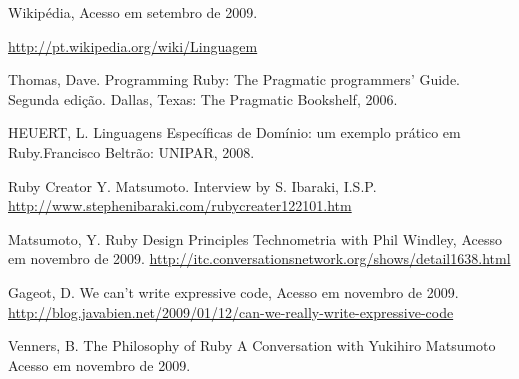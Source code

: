 \documentclass[espaco=simples,appendix=Name]{abnt}
\begin{document}

\begin{thebibliography}{9} 
Wikipédia, 
Acesso em setembro de 2009.

\url{http://pt.wikipedia.org/wiki/Linguagem}

Thomas, Dave. 
Programming Ruby: The Pragmatic programmers’ Guide. 
Segunda edição. Dallas, Texas: The Pragmatic Bookshelf, 2006.


HEUERT, L. Linguagens Específicas de Domínio: um exemplo prático em Ruby.Francisco Beltrão: UNIPAR, 2008.

Ruby Creator Y. Matsumoto.
Interview by S. Ibaraki, I.S.P.
\url{http://www.stephenibaraki.com/rubycreater122101.htm}

Matsumoto, Y.
Ruby Design Principles
Technometria with Phil Windley, 
Acesso em novembro de 2009.
\url{http://itc.conversationsnetwork.org/shows/detail1638.html}

Gageot, D.
We can’t write expressive code,
Acesso em novembro de 2009.
\url{http://blog.javabien.net/2009/01/12/can-we-really-write-expressive-code}

Venners, B. The Philosophy of Ruby
A Conversation with Yukihiro Matsumoto
Acesso em novembro de 2009.
\end{thebibliography} 
\end{document}
